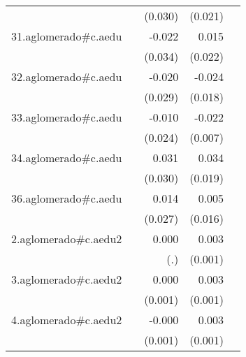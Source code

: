 {\begin{longtable}{l*{4}{D{.}{.}{-1}}}
            &                     &     (0.030)         &     (0.021)         &                     \\
\addlinespace
31.aglomerado#c.aedu&                     &      -0.022         &       0.015         &                     \\
            &                     &     (0.034)         &     (0.022)         &                     \\
\addlinespace
32.aglomerado#c.aedu&                     &      -0.020         &      -0.024         &                     \\
            &                     &     (0.029)         &     (0.018)         &                     \\
\addlinespace
33.aglomerado#c.aedu&                     &      -0.010         &      -0.022\sym{**} &                     \\
            &                     &     (0.024)         &     (0.007)         &                     \\
\addlinespace
34.aglomerado#c.aedu&                     &       0.031         &       0.034         &                     \\
            &                     &     (0.030)         &     (0.019)         &                     \\
\addlinespace
36.aglomerado#c.aedu&                     &       0.014         &       0.005         &                     \\
            &                     &     (0.027)         &     (0.016)         &                     \\
\addlinespace
2.aglomerado#c.aedu2&                     &       0.000         &       0.003\sym{**} &                     \\
            &                     &         (.)         &     (0.001)         &                     \\
\addlinespace
3.aglomerado#c.aedu2&                     &       0.000         &       0.003\sym{***}&                     \\
            &                     &     (0.001)         &     (0.001)         &                     \\
\addlinespace
4.aglomerado#c.aedu2&                     &      -0.000         &       0.003\sym{***}&                     \\
            &                     &     (0.001)         &     (0.001)         &                     \\

\end{longtable}}
